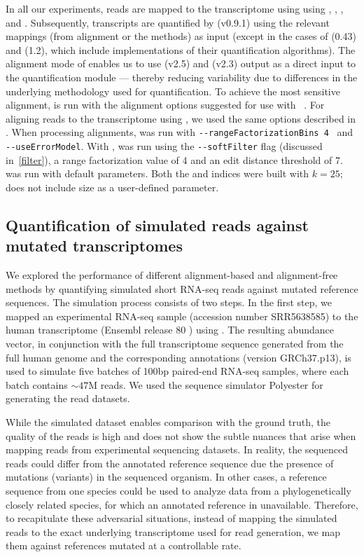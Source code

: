 In all our experiments, reads are mapped to the transcriptome using using \bt, \kallisto, \hera, \sla and \STAR. 
Subsequently, transcripts are quantified by \salmon(v0.9.1) using the relevant mappings (from alignment or the 
\nab methods) as input (except in the cases of \kallisto(0.43) and \hera(1.2), which include implementations of 
their quantification algorithms). The alignment mode of \salmon enables us to use \STAR(v2.5) and \bt(v2.3) output 
as a direct input to the quantification module --- thereby reducing variability due to differences in the 
underlying methodology used for quantification. To achieve the most sensitive alignment, \bt is run with the 
alignment options suggested for use with \rsem~\citep{rsembmc}. For aligning reads to the transcriptome using 
\STAR, we used the same options described in \citep{Srivastava2016rapmap}. When processing alignments, \salmon 
was run with \texttt{-{}-rangeFactorizationBins 4}~\citep{ismb2017factorization} and \texttt{-{}-useErrorModel}. 
With \sla, \salmon was run using the \texttt{-{}-softFilter} flag (discussed in~\cref{filter}), 
a range factorization value of 4 and an edit distance threshold of 7. \kallisto was run with default parameters. 
Both the \sla and \kallisto indices were built with $k=25$; \hera does not include \kmer size as a user-defined 
parameter.

\subsection{Quantification of simulated reads against mutated transcriptomes}\label{subsec:synthetic}

We explored the performance of different alignment-based and alignment-free methods by quantifying simulated short 
RNA-seq reads against mutated reference sequences. The simulation process consists of two steps. In the first step, 
we mapped an experimental RNA-seq sample (accession number SRR5638585) to the human transcriptome (Ensembl release 
80 \citep{yates2015ensembl} ) using \salmon. The resulting abundance vector, in conjunction with the full 
transcriptome sequence generated from the full human genome and the corresponding annotations (version GRCh37.p13), 
is used to simulate five batches of 100bp paired-end RNA-seq samples, where each batch contains $\sim47$M reads. 
We used the sequence simulator Polyester \citep{frazee2015polyester} for generating the read datasets.

While the simulated dataset enables comparison with the ground truth, the quality of the reads is high and does 
not show the subtle nuances that arise when mapping reads from experimental sequencing datasets. In reality, the 
sequenced reads could differ from the annotated reference sequence due the presence of mutations (variants) in the 
sequenced organism. In other cases, a reference sequence from one species could be used to analyze data from a 
phylogenetically closely related species, for which an annotated reference in unavailable. Therefore, to 
recapitulate these adversarial situations, instead of mapping the simulated reads to the exact underlying 
transcriptome used for read generation, we map them against references mutated at a controllable rate.

